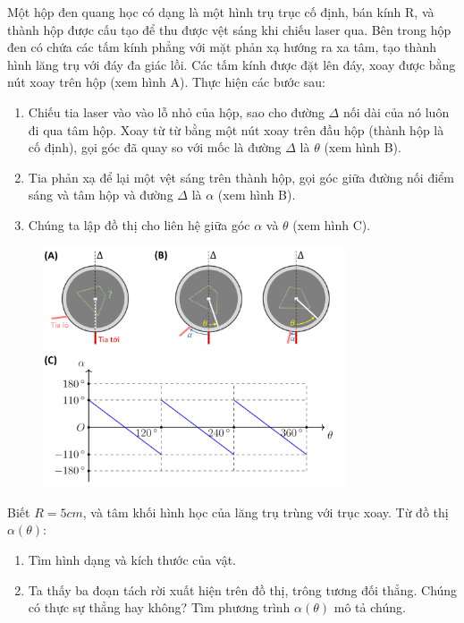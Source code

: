     Một hộp đen quang học có dạng là một hình trụ trục cố định, bán kính R, và thành hộp được cấu tạo để thu được vệt sáng khi chiếu laser qua. Bên trong hộp đen có chứa các tấm kính phẳng với mặt phản xạ hướng ra xa tâm, tạo thành hình lăng trụ với đáy đa giác lồi. Các tấm kính được đặt lên đáy, xoay được bằng nút xoay trên hộp (xem hình A). Thực hiện các bước sau:
    \begin{enumerate}
    [label=\arabic*)]
        \item Chiếu tia laser vào vào lỗ nhỏ của hộp, sao cho đường $\Delta$ nối dài của nó luôn đi qua tâm hộp. Xoay từ từ bằng một nút xoay trên đầu hộp (thành hộp là cố định), gọi góc đã quay so với mốc là đường $\Delta$ là $\theta$ (xem hình B).
        \item Tia phản xạ để lại một vệt sáng trên thành hộp, gọi góc giữa đường nối điểm sáng và tâm hộp và đường $\Delta$ là $\alpha$ (xem hình B).
        \item Chúng ta lập đồ thị cho liên hệ giữa góc $\alpha$ và $\theta$ (xem hình C).
    \end{enumerate}

\begin{figure}[ht]
\centering
\includegraphics[width=0.8\textwidth,keepaspectratio]{Problem_4/Figs/P4.png}
\end{figure}

Biết $R=5cm$, và tâm khối hình học của lăng trụ trùng với trục xoay. Từ đồ thị $\alpha(\theta)$:
\begin{enumerate} [label=\roman*)]
        \item Tìm hình dạng và kích thước của vật.
        \item Ta thấy ba đoạn tách rời xuất hiện trên đồ thị, trông tương đối thẳng. Chúng có thực sự thẳng hay không? Tìm phương trình $\alpha(\theta)$ mô tả chúng.
\end{enumerate}



